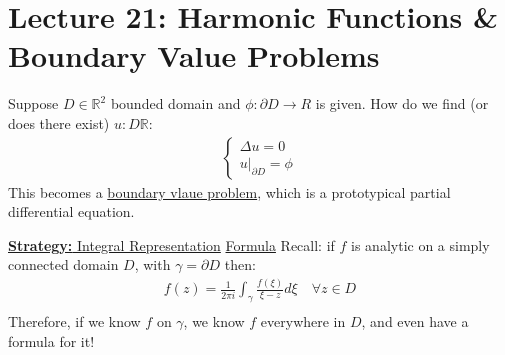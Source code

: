 \chapter{Lecture 21: Harmonic Functions \& Boundary Value Problems}

\begin{proposition}
    Suppose $D \in \mathbb{R}^2$ bounded domain and $\phi: \partial D \to R$ is given. How do we find (or does there exist) $u : D \mathbb{R}$:
    \begin{align}
        \begin{cases}
            \Delta u = 0 \\
            u|_{\partial D} = \phi
        \end{cases}
    \end{align}
    This becomes a \underline{boundary vlaue problem}, which is a prototypical partial differential equation.
\end{proposition}

\begin{theorem}
    \underline{\textbf{Strategy:} Integral Representation} \underline{Formula}
    Recall: if $f$ is analytic on a simply connected domain $D$, with $\gamma = \partial D$ then:
    \begin{align}
        f(z) = \frac{1}{2\pi i}\int_{\gamma} \frac{f(\xi)}{\xi - z} d\xi \quad \forall z \in D \\
    \end{align}
    Therefore, if we know $f$ on $\gamma$, we know $f$ everywhere in $D$, and even have a formula for it!
\end{theorem}

